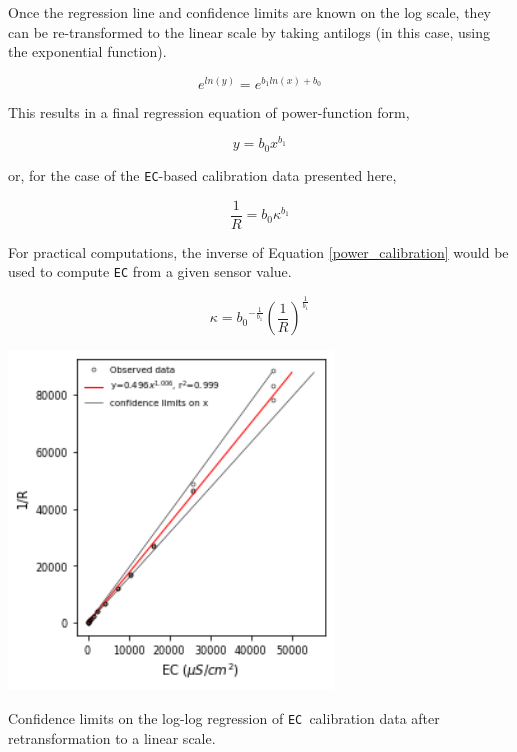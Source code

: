 Once the regression line and confidence limits are known on the log scale, they can be re-transformed to the linear scale by taking antilogs (in this case, using the exponential function). 

\begin{equation}
	e^{ln(y)} = e^{b_1 ln(x) + b_0}
\end{equation}

This results in a final regression equation of power-function form,

\begin{equation}
	y = b_0 x^{b_1}
\end{equation}

or, for the case of the \texttt{EC}-based calibration data presented here,

\begin{equation}\label{power_calibration}
	\frac{1}{R} = b_0 \kappa^{b_1}
\end{equation}

For practical computations, the inverse of Equation \ref{power_calibration} would be used to compute \texttt{EC} from a given sensor value.

\begin{equation}\label{power_calibration}
	\kappa = {b_0}^{-\frac{1}{b_1}}\left ( \frac{1}{R}\right )^{\frac{1}{b_1}} 
\end{equation}

\begin{marginfigure}[0cm]
	\begin{center}
		\includegraphics[height=9cm]{Images/log_confidence_retransformed.png}
		\caption[Confidence Limits on Retransformed Log-Log Regression]{Confidence limits on the log-log regression of \texttt{EC }calibration data after retransformation to a linear scale.}
	\end{center}
\end{marginfigure}

